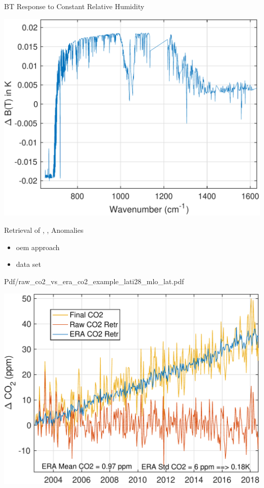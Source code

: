 \documentclass[10pt,t]{beamer}
\begin{document}
\begin{frame}[label={sec:orgc68a3b9}]{BT Response to Constant Relative Humidity}
\begin{center}
\includegraphics[width=0.7\linewidth]{./Figs/Pdf/dbt_constantRH_dsurf_dtrop=0.02k_dstrat=m0.02k.pdf}
\end{center}
\end{frame}
\begin{frame}[label={sec:org0b88e23}]{Retrieval of \cd, \nitrous, \methane Anomalies}
\begin{itemize}
\item oem approach
\item data set
\end{itemize}
\end{frame}
\begin{frame}[label={sec:org4cd4520}]{Pdf/raw\_co2\_vs\_era\_co2\_example\_lati28\_mlo\_lat.pdf}
\begin{center}
\includegraphics[width=0.7\linewidth]{./Figs/Pdf/raw_co2_vs_era_co2_example_lati28_mlo_lat.pdf}
\end{center}
\end{frame}
\end{document}
